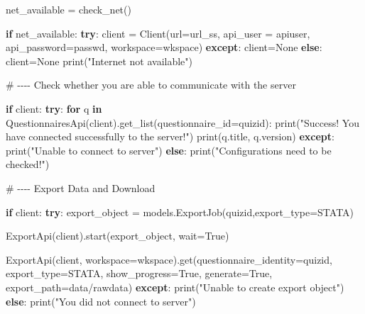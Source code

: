 \documentclass[
  letterpaper,
  DIV=11,
  numbers=noendperiod]{scrreprt}
\newenvironment{Shaded}{\begin{snugshade}}{\end{snugshade}}
\newcommand{\BuiltInTok}[1]{\textcolor[rgb]{0.00,0.23,0.31}{#1}}
\newcommand{\CommentTok}[1]{\textcolor[rgb]{0.37,0.37,0.37}{#1}}
\newcommand{\ControlFlowTok}[1]{\textcolor[rgb]{0.00,0.23,0.31}{\textbf{#1}}}
\newcommand{\KeywordTok}[1]{\textcolor[rgb]{0.00,0.23,0.31}{\textbf{#1}}}
\newcommand{\NormalTok}[1]{\textcolor[rgb]{0.00,0.23,0.31}{#1}}
\newcommand{\OperatorTok}[1]{\textcolor[rgb]{0.37,0.37,0.37}{#1}}
\newcommand{\StringTok}[1]{\textcolor[rgb]{0.13,0.47,0.30}{#1}}
\newcommand{\VariableTok}[1]{\textcolor[rgb]{0.07,0.07,0.07}{#1}}
\begin{document}
\begin{Shaded}
\begin{Highlighting}[]
\NormalTok{net\_available }\OperatorTok{=}\NormalTok{ check\_net()}


\ControlFlowTok{if}\NormalTok{ net\_available:}
  \ControlFlowTok{try}\NormalTok{:}
\NormalTok{    client }\OperatorTok{=}\NormalTok{ Client(url}\OperatorTok{=}\NormalTok{url\_ss,}
\NormalTok{    api\_user }\OperatorTok{=}\NormalTok{ apiuser, }
\NormalTok{    api\_password}\OperatorTok{=}\NormalTok{passwd,}
\NormalTok{    workspace}\OperatorTok{=}\NormalTok{wkspace)}
  \ControlFlowTok{except}\NormalTok{:}
\NormalTok{    client}\OperatorTok{=}\VariableTok{None}
\ControlFlowTok{else}\NormalTok{:}
\NormalTok{  client}\OperatorTok{=}\VariableTok{None}
  \BuiltInTok{print}\NormalTok{(}\StringTok{"Internet not available"}\NormalTok{)}
  
  
\CommentTok{\# {-}{-}{-}{-} Check whether you are able to communicate with the server}

\ControlFlowTok{if}\NormalTok{ client:}
  \ControlFlowTok{try}\NormalTok{:}
    \ControlFlowTok{for}\NormalTok{ q }\KeywordTok{in}\NormalTok{ QuestionnairesApi(client).get\_list(questionnaire\_id}\OperatorTok{=}\NormalTok{quizid):}
      \BuiltInTok{print}\NormalTok{(}\StringTok{"Success! You have connected successfully to the server!"}\NormalTok{)}
      \BuiltInTok{print}\NormalTok{(q.title, q.version)}
  \ControlFlowTok{except}\NormalTok{:}
    \BuiltInTok{print}\NormalTok{(}\StringTok{"Unable to connect to server"}\NormalTok{)}
\ControlFlowTok{else}\NormalTok{:}
  \BuiltInTok{print}\NormalTok{(}\StringTok{"Configurations need to be checked!"}\NormalTok{)}
  

\CommentTok{\# {-}{-}{-}{-} Export Data and Download}

\ControlFlowTok{if}\NormalTok{ client:}
  \ControlFlowTok{try}\NormalTok{:}
\NormalTok{    export\_object }\OperatorTok{=}\NormalTok{ models.ExportJob(quizid,export\_type}\OperatorTok{=}\StringTok{\textquotesingle{}STATA\textquotesingle{}}\NormalTok{)}
  
\NormalTok{    ExportApi(client).start(export\_object, wait}\OperatorTok{=}\VariableTok{True}\NormalTok{)}
    
\NormalTok{    ExportApi(client, workspace}\OperatorTok{=}\NormalTok{wkspace).get(questionnaire\_identity}\OperatorTok{=}\NormalTok{quizid,}
\NormalTok{                          export\_type}\OperatorTok{=}\StringTok{\textquotesingle{}STATA\textquotesingle{}}\NormalTok{,}
\NormalTok{                          show\_progress}\OperatorTok{=}\VariableTok{True}\NormalTok{,}
\NormalTok{                          generate}\OperatorTok{=}\VariableTok{True}\NormalTok{,}
\NormalTok{                          export\_path}\OperatorTok{=}\StringTok{\textquotesingle{}data/rawdata\textquotesingle{}}\NormalTok{)}
  \ControlFlowTok{except}\NormalTok{:}
    \BuiltInTok{print}\NormalTok{(}\StringTok{"Unable to create export object"}\NormalTok{)}
\ControlFlowTok{else}\NormalTok{:}
  \BuiltInTok{print}\NormalTok{(}\StringTok{"You did not connect to server"}\NormalTok{)}
\end{Highlighting}
\end{Shaded}
\end{document}

